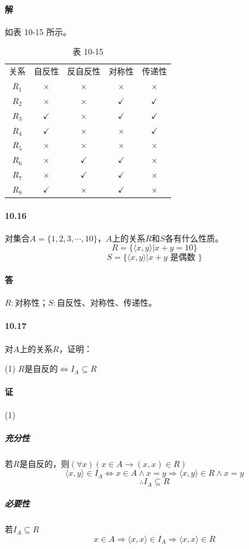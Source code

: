 \documentclass[UTF8]{ctexart}
\begin{document}
\paragraph{解} 如表 10-15 所示。
    \begin{table}[htb]
        \centering
        \begin{tabular}{ccccc}
        关系    & 自反性          & 反自反性         & 对称性          & 传递性          \\
        $R_1$ & $\times$     & $\times$     & $\times$     & $\times$     \\
        $R_2$ & $\times$     & $\times$     & $\checkmark$ & $\checkmark$ \\
        $R_3$ & $\checkmark$ & $\times$     & $\checkmark$ & $\checkmark$ \\
        $R_4$ & $\checkmark$ & $\times$     & $\times$     & $\checkmark$ \\
        $R_5$ & $\times$     & $\times$     & $\times$     & $\times$     \\
        $R_6$ & $\times$     & $\checkmark$ & $\checkmark$ & $\times$     \\
        $R_7$ & $\times$     & $\checkmark$ & $\checkmark$ & $\times$     \\
        $R_8$ & $\checkmark$ & $\times$     & $\checkmark$ & $\times$    
        \end{tabular}
        \caption*{表 10-15}
    \end{table}

\paragraph{10.16} \label{10.16}
    对集合$A=\{1,2,3,\cdots,10\}$，$A$上的关系$R$和$S$各有什么性质。
    $$R= \{ \langle x,y \rangle |x+y=10 \}$$
    $$S= \{ \langle x,y \rangle |x+y\text { 是偶数 } \} $$

\paragraph{答}$R:$对称性；$S:$自反性、对称性、传递性。

\paragraph{10.17} \label{10.17}
    对$A$上的关系$R$，证明：
    
    (1) $R\text{是自反的} \Longleftrightarrow I_A\subseteq R$

\paragraph{证} (1)
    \subparagraph{充分性} 若$R$是自反的，则$ ( \forall x)(x \in A \rightarrow (x,x) \in R)$
        $$ \langle x,y \rangle \in I_A \Longleftrightarrow x \in A \land x = y \Longrightarrow \langle x,y \rangle \in R \land x=y$$
        $$\therefore I_A \subseteq R$$
    \subparagraph{必要性} 若$I_A \subseteq R$
        $$x \in A \Longrightarrow \langle x,x \rangle \in I_A \Longrightarrow \langle x,x \rangle \in R$$
        
\end{document}
